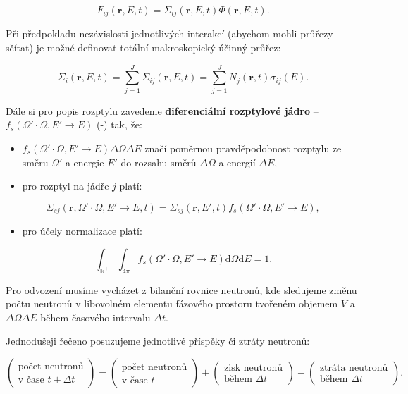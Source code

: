 $$ F_{ij}(\textbf{r}, E, t) = \Sigma_{ij}(\textbf{r}, E, t) \Phi(\textbf{r}, E, t). $$

Při předpokladu nezávislosti jednotlivých interakcí (abychom mohli průřezy sčítat) je možné definovat totální makroskopický účinný průřez:

$$ \Sigma_i(\textbf{r}, E, t) = \sum_{j=1}^J \Sigma_{ij}(\textbf{r}, E, t) = \sum_{j=1}^J N_j(\textbf{r}, t) \sigma_{ij}(E). $$

Dále si pro popis rozptylu zavedeme \textbf{diferenciální rozptylové jádro} -- $f_s(\Omega' \cdot \Omega, E' \rightarrow E)$ (-) tak, že:

\begin{itemize}
  \item $f_s(\Omega' \cdot \Omega, E' \rightarrow E) \Delta \Omega \Delta E$ značí poměrnou pravděpodobnost rozptylu ze směru $\Omega'$ a energie $E'$ do rozsahu směrů $\Delta \Omega$ a energií $\Delta E$,
  \item pro rozptyl na jádře $j$ platí:
\end{itemize}
$$\Sigma_{sj}(\textbf{r}, \Omega' \cdot \Omega, E' \rightarrow E, t) = \Sigma_{sj}(\textbf{r}, E', t) f_s(\Omega' \cdot \Omega, E' \rightarrow E), $$

\begin{itemize}
  \item pro účely normalizace platí:
\end{itemize}
$$\int_\mathbb{R^+} \int_{4 \pi} f_s(\Omega' \cdot \Omega, E' \rightarrow E) \text{d} \Omega \text{d}E = 1. $$


Pro odvození musíme vycházet z bilanční rovnice neutronů, kde sledujeme změnu počtu neutronů v libovolném elementu fázového prostoru tvořeném objemem $V$ a $\Delta \Omega \Delta E$ během časového intervalu $\Delta t$.

Jednodušeji řečeno posuzujeme jednotlivé příspěky či ztráty neutronů:

\begin{equation}
  \boxed{
  \begin{pmatrix} \text{počet neutronů} \\ \text{v čase } t + \Delta t \end{pmatrix} = \begin{pmatrix} \text{počet neutronů} \\ \text{v čase } t \end{pmatrix} + \begin{pmatrix} \text{zisk neutronů} \\ \text{během } \Delta t \end{pmatrix} - \begin{pmatrix} \text{ztráta neutronů} \\ \text{během } \Delta t \end{pmatrix}.
  \label{bilancni_rovnice}}
\end{equation}


